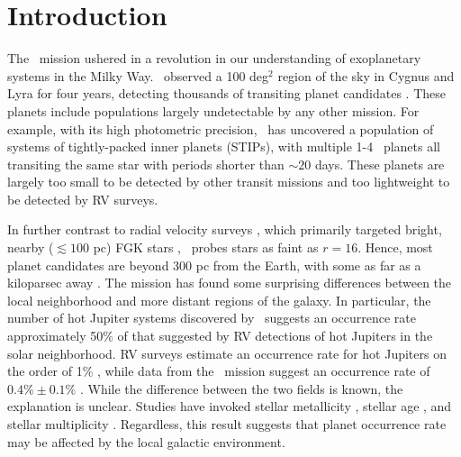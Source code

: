 
\section{Introduction}
\label{sec:intro-8}

The \kep\ mission \citep{Borucki10} ushered in a revolution in our
understanding of exoplanetary systems in the Milky Way.
\kep\ observed a 100 deg$^2$ region of the sky in Cygnus and Lyra for
four years, detecting thousands of transiting planet candidates
\citep{Batalha13, Burke14, Mullally15, Rowe15}.  These planets include
populations largely undetectable by any other mission. For example,
with its high photometric precision, \kep\ has uncovered a population
of systems of tightly-packed inner planets (STIPs), with multiple 1-4
\rearth\ planets all transiting the same star with periods shorter than
$\sim 20$ days. These planets are largely too small to be detected by
other transit missions and too lightweight to be detected by RV
surveys.

In further contrast to radial velocity surveys \citep[e.g.][]{Udry07,
  Ford14}, which primarily targeted bright, nearby ($\lesssim 100$ pc)
FGK stars \citep{Valenti05, Ammons06}, \kep\, probes stars as faint as
$r = 16$. Hence, most \kep\, planet candidates are beyond 300 pc from
the Earth, with some as far as a kiloparsec away \citep{Lillo-Box14,
  Barclay15, Quinn15}.  The mission has found some surprising
differences between the local neighborhood and more distant regions of
the galaxy.  In particular, the number of hot Jupiter systems
discovered by \kep\ suggests an occurrence rate approximately 50\% of
that suggested by RV detections of hot Jupiters in the solar
neighborhood.  RV surveys estimate an occurrence rate for hot Jupiters
on the order of 1\% \citep{Cumming08, Mayor11}, while data from the
\kep\ mission suggest an occurrence rate of $0.4\% \pm 0.1\%$
\citep{Howard12}.  
While the difference between the two fields is known, the
explanation is unclear. Studies have invoked stellar metallicity
\citep{Howard12, Wright12, Dawson13}, stellar age \citep{Schlaufman13}, and
stellar multiplicity \citep{Wang14, Wang15a}. Regardless, this result
suggests that planet occurrence rate may be affected by the local
galactic environment. 

